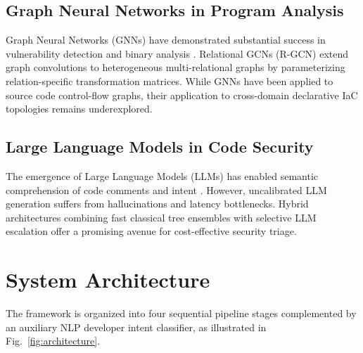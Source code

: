 \documentclass[conference]{IEEEtran}
\begin{document}
\subsection{Graph Neural Networks in Program Analysis}
Graph Neural Networks (GNNs) have demonstrated substantial success in vulnerability detection and binary analysis \cite{scarselli2009gnn, kipf2017gcn}. Relational GCNs (R-GCN) \cite{schlichtkrull2018rgcn} extend graph convolutions to heterogeneous multi-relational graphs by parameterizing relation-specific transformation matrices. While GNNs have been applied to source code control-flow graphs, their application to cross-domain declarative IaC topologies remains underexplored.

\subsection{Large Language Models in Code Security}
The emergence of Large Language Models (LLMs) has enabled semantic comprehension of code comments and intent \cite{vaswani2017attention, wei2022chain}. However, uncalibrated LLM generation suffers from hallucinations and latency bottlenecks. Hybrid architectures combining fast classical tree ensembles \cite{breiman2001rf, niculescu2005calibration} with selective LLM escalation offer a promising avenue for cost-effective security triage.

\section{System Architecture}
The framework is organized into four sequential pipeline stages complemented by an auxiliary NLP developer intent classifier, as illustrated in Fig.~\ref{fig:architecture}.
\end{document}
